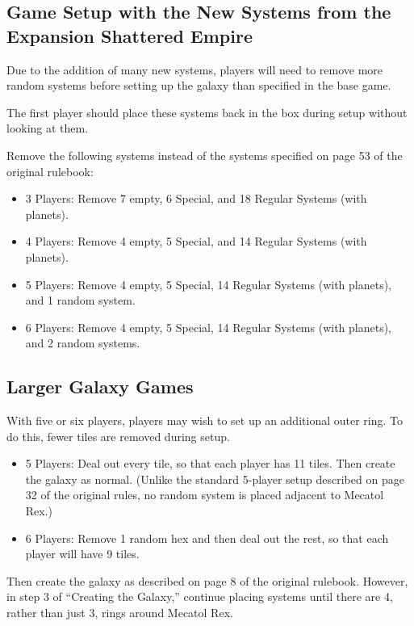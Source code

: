 \documentclass[11pt,fleqn]{book} %
\begin{document}
\begin{SEbox}
    \subsection{Game Setup with the New Systems from the Expansion Shattered Empire}
    Due to the addition of many new systems, players will need to remove more random systems before setting up the galaxy than specified in the base game.

The first player should place these systems back in the box during setup without looking at them.

Remove the following systems instead of the systems specified on page 53 of the original rulebook:
\begin{itemize}
\item 3 Players: Remove 7 empty, 6 Special, and 18 Regular Systems (with planets).
\item 4 Players: Remove 4 empty, 5 Special, and 14 Regular Systems (with planets).
\item 5 Players: Remove 4 empty, 5 Special, 14 Regular Systems (with planets), and 1 random system.
\item 6 Players: Remove 4 empty, 5 Special, 14 Regular Systems (with planets), and 2 random systems.
\end{itemize}
\subsection{Larger Galaxy Games}
With five or six players, players may wish to set up an additional outer ring. To do this, fewer tiles are removed during setup.
\begin{itemize}
\item 5 Players: Deal out every tile, so that each player has 11 tiles. Then create the galaxy as normal. (Unlike the standard 5-player setup described on page 32 of the original rules, no random system is placed adjacent to Mecatol Rex.)
\item 6 Players: Remove 1 random hex and then deal out the rest, so that each player will have 9 tiles.
\end{itemize}

Then create the galaxy as described on page 8 of the original rulebook. However, in step 3 of “Creating the Galaxy,” continue placing systems until there are 4, rather than just 3, rings around Mecatol Rex.
\end{SEbox}
\end{document}
